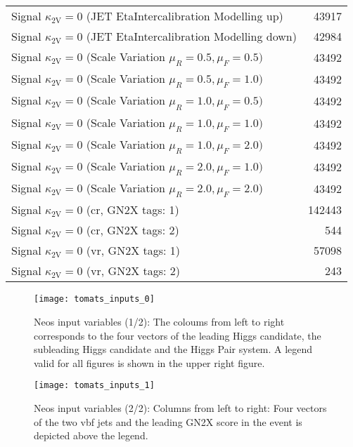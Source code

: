 \begin{table}[]
\begin{tabular}{lr}
        Signal $\kappa_\mathrm{2V}=0$ (JET EtaIntercalibration Modelling up)           & 43917  \\
        Signal $\kappa_\mathrm{2V}=0$ (JET EtaIntercalibration Modelling down)         & 42984  \\
        Signal $\kappa_\mathrm{2V}=0$ (Scale Variation $\mu_R = 0.5, \mu_F=0.5)$       & 43492  \\
        Signal $\kappa_\mathrm{2V}=0$ (Scale Variation $\mu_R = 0.5, \mu_F=1.0)$       & 43492  \\
        Signal $\kappa_\mathrm{2V}=0$ (Scale Variation $\mu_R = 1.0, \mu_F=0.5)$       & 43492  \\
        Signal $\kappa_\mathrm{2V}=0$ (Scale Variation $\mu_R = 1.0, \mu_F=1.0)$       & 43492  \\
        Signal $\kappa_\mathrm{2V}=0$ (Scale Variation $\mu_R = 1.0, \mu_F=2.0)$       & 43492  \\
        Signal $\kappa_\mathrm{2V}=0$ (Scale Variation $\mu_R = 2.0, \mu_F=1.0)$       & 43492  \\
        Signal $\kappa_\mathrm{2V}=0$ (Scale Variation $\mu_R = 2.0, \mu_F=2.0$)       & 43492  \\ \hline
        Signal $\kappa_\mathrm{2V}=0$ (\ac{cr}, GN2X tags: 1)                          & 142443 \\
        Signal $\kappa_\mathrm{2V}=0$ (\ac{cr}, GN2X tags: 2)                          & 544    \\
        Signal $\kappa_\mathrm{2V}=0$ (\ac{vr}, GN2X tags: 1)                          & 57098  \\
        Signal $\kappa_\mathrm{2V}=0$ (\ac{vr}, GN2X tags: 2)                          & 243    \\
    \end{tabular}
    \label{tab:neos-samples}
\end{table}


\begin{figure}
    \centering
    \texttt{[image: tomats\_inputs\_0]}
    \caption[]{Neos input variables (1/2): The coloums from left to right corresponds to the four vectors of the leading Higgs candidate, the subleading Higgs candidate and the Higgs Pair system. A legend valid for all figures is shown in the upper right figure.}
    \label{fig:tomats_inputs_0}
\end{figure}



\begin{figure}
    \centering
    \texttt{[image: tomats\_inputs\_1]}
    \caption[]{Neos input variables (2/2): Columns from left to right: Four vectors of the two vbf jets and the leading GN2X score in the event is depicted above the legend.}
    \label{fig:tomats_inputs_1}
\end{figure}

